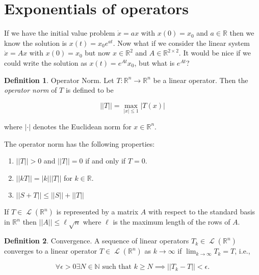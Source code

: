 \documentclass[12pt]{article}
\DeclareMathOperator{\LO}{\mathcal{L}}
\theoremstyle{definition}
\newtheorem*{definition}{Definition}
\begin{document}
\section{Exponentials of operators}

If we have the initial value problem $\dot x = ax$ with $x(0) = x_0$ and $a \in \mathbb{R}$ then we know the solution is $x(t) = x_0 e^{at}$. Now
what if we consider the linear system $\dot x = Ax$ with $x(0) = x_0$ but now $x \in \mathbb{R}^2$ and $A \in \mathbb{R}^{2 \times 2}$. It would
be nice if we could write the solution as $x(t) = e^{At} x_0$, but what is $e^{At}$?

\begin{definition} Operator Norm.
Let $T: \mathbb{R}^n \rightarrow \mathbb{R}^n$ be a linear operator. Then the \textit{operator norm} of $T$ is defined to be

\begin{equation*}
|| T || = \max_{|x| \leq 1} \left| T(x) \right|
\end{equation*}

where $|\cdot|$ denotes the Euclidean norm for $x \in \mathbb{R}^n$.
\end{definition}

The operator norm has the following properties:

\begin{enumerate}[label=(\alph*)]
\item $|| T || > 0$ and $|| T || = 0$ if and only if $T = 0$.
\item $|| kT || = |k| || T ||$ for $k \in \mathbb{R}$.
\item $|| S + T || \leq ||S|| + ||T||$
\end{enumerate}

If $T \in \LO(\mathbb{R}^n)$ is represented by a matrix $A$ with respect to the standard basis in $\mathbb{R}^n$ then
$|| A || \leq \ell \sqrt{n}$ where $\ell$ is the maximum length of the rows of $A$.

\begin{definition} Convergence.
A sequence of linear operators $T_k \in \LO(\mathbb{R}^n)$ converges to a linear operator $T \in \LO(\mathbb{R}^n)$ as
$k \rightarrow \infty$ if $\lim_{k \rightarrow \infty} T_k = T$, i.e.,

\[
\forall \epsilon > 0 \exists N \in \mathbb{N} \text{ such that } k \geq N \implies || T_k - T || < \epsilon .
\] 

\end{definition}
\end{document}

